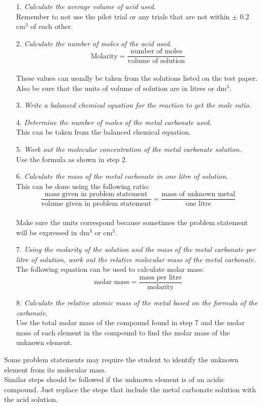 \begin{enumerate}
\item[1.] \textit{Calculate the average volume of acid used.}\\
Remember to not use the pilot trial or any trials that are not within $\pm$ 0.2 cm$^3$ of each other.
\item[2.] \textit{Calculate the number of moles of the acid used.}\\
$$\text{Molarity} = \frac{\text{number of moles}}{\text{volume of solution}}$$\\
These values can usually be taken from the solutions listed on the test paper. Also be sure that the units of volume of solution are in litres or dm$^3$.
\item[3.] \textit{Write a balanced chemical equation for the reaction to get the mole ratio.}
\item[4.] \textit{Determine the number of moles of the metal carbonate used.}\\
This can be taken from the balanced chemical equation.
\item[5.] \textit{Work out the molecular concentration of the metal carbonate solution.}\\
Use the formula as shown in step 2.
\item[6.] \textit{Calculate the mass of the metal carbonate in one litre of solution.}\\
This can be done using the following ratio:\\
$$\frac{\text{mass given in problem statement}}{\text{volume given in problem statement}} = \frac{\text{mass of unknown metal}}{\text{one litre}}$$\\
Make sure the units correspond because sometimes the problem statement will be expressed in dm$^3$ or cm$^3$.
\item[7.] \textit{Using the molarity of the solution and the mass of the metal carbonate per litre of solution, work out the relative molecular mass of the metal carbonate.}\\
The following equation can be used to calculate molar mass:\\
$$\text{molar mass} = \frac{\text{mass per litre}}{\text{molarity}}$$
\item[8.] \textit{Calculate the relative atomic mass of the metal based on the formula of the carbonate.}\\
Use the total molar mass of the compound found in step 7 and the molar mass of each element in the compound to find the molar mass of the unknown element.
\end{enumerate}
Some problem statements may require the student to identify the unknown element from its molecular mass.\\
Similar steps should be followed if the unknown element is of an acidic compound. Just replace the steps that include the metal carbonate solution with the acid solution.


